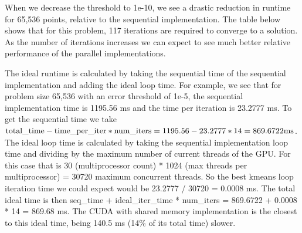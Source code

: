 \documentclass{article}
\begin{document}
\begin{center}
  
\end{center}

When we decrease the threshold to 1e-10, we see a drastic reduction in runtime
for 65,536 points, relative to the sequential implementation.
The table below shows that for this problem, 117 iterations are required to
converge to a solution.
As the number of iterations increases we can expect to see much better relative
performance of the parallel implementations.

\begin{center}
  
\end{center}

The ideal runtime is calculated by taking the sequential time of the sequential
implementation and adding the ideal loop time.
For example, we see that for problem size 65,536 with an error threshold of
1e-5, the sequential implementation time is 1195.56 ms and the time per
iteration is 23.2777 ms.
To get the sequential time we take ${\rm total\_time} - {\rm time\_per\_iter} * {\rm num\_iters} =
1195.56 - 23.2777 * 14 = 869.6722 {\rm ms}$.
The ideal loop time is calculated by taking the sequential implementation loop
time and dividing by the maximum number of current threads of the GPU.
For this case that is 30 (multiprocessor count) * 1024 (max threads per
multiprocessor) = 30720 maximum concurrent threads.
So the best kmeans loop iteration time we could expect would be 23.2777 / 30720
= 0.0008 ms.
The total ideal time is then seq\_time + ideal\_iter\_time * num\_iters =
869.6722 + 0.0008 * 14 = 869.68 ms.
The CUDA with shared memory implementation is the closest to this ideal time,
being 140.5 ms (14\% of its total time) slower.
\end{document}
